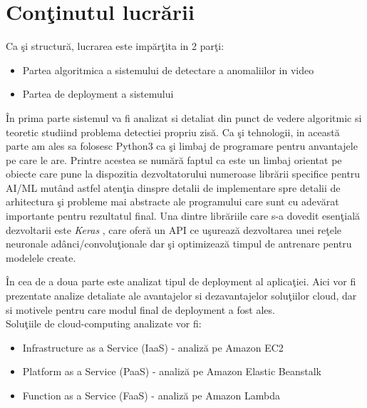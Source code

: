 \documentclass[a4paper,12pt]{report}
\begin{document}
\section{Conţinutul lucrării}
 Ca şi structură, lucrarea este impărţita in 2 parţi:
\begin{itemize}
\item Partea algoritmica a sistemului de detectare a anomaliilor in video
\item Partea de deployment a sistemului
\end{itemize}
\par În prima parte sistemul va fi analizat si detaliat din punct de vedere algoritmic si teoretic studiind problema detectiei propriu zisă. Ca şi tehnologii, in această parte am ales sa folosesc Python3 ca şi limbaj de programare pentru anvantajele pe care le are. Printre acestea se numără faptul ca este un limbaj orientat pe obiecte care pune la dispozitia dezvoltatorului numeroase librării specifice pentru AI/ML mutând astfel atenţia dinspre detalii de implementare spre detalii de arhitectura şi probleme mai abstracte ale programului care sunt cu adevărat importante pentru rezultatul final. Una dintre librăriile care s-a dovedit esenţială dezvoltarii este \emph{Keras} \cite{2020keras}, care oferă un API ce uşurează dezvoltarea unei reţele neuronale adânci/convoluţionale dar şi optimizează timpul de antrenare pentru modelele create.  \par
În cea de a doua parte este analizat tipul de deployment al aplicaţiei. Aici vor fi prezentate analize detaliate ale avantajelor si dezavantajelor soluţiilor cloud, dar si motivele pentru care modul final de deployment a fost ales. \\
Soluţiile de cloud-computing analizate vor fi:
\begin{itemize}
\item Infrastructure as a Service (IaaS) - analiză pe Amazon EC2
\item Platform as a Service (PaaS) - analiză pe Amazon Elastic Beanstalk
\item Function as a Service (FaaS) - analiză pe Amazon Lambda
\end{itemize}
\end{document}
